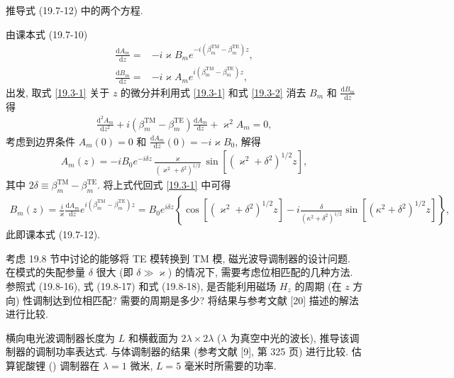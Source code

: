 \documentclass{note}
\begin{document}
\begin{exe}
    推导式 (19.7-12) 中的两个方程.
\end{exe}
\begin{pf}
    由课本式 (19.7-10)
    \begin{align}
        \label{19.3-1}
        \frac{\mathrm{d}A_m}{\mathrm{d}z}=&-i\varkappa B_me^{-i(\beta_m^{\text{TM}}-\beta_m^{\text{TE}})z},\\
        \label{19.3-2}
        \frac{\mathrm{d}B_m}{\mathrm{d}z}=&-i\varkappa A_me^{i(\beta_m^{\text{TM}}-\beta_m^{\text{TE}})z},
    \end{align}
    出发, 取式 \eqref{19.3-1} 关于 $z$ 的微分并利用式 \eqref{19.3-1} 和式 \eqref{19.3-2} 消去 $B_m$ 和 $\frac{\mathrm{d}B_m}{\mathrm{d}z}$ 得
    \begin{align}
        \frac{\mathrm{d}^2A_m}{\mathrm{d}z^2}+i(\beta_m^{\text{TM}}-\beta_m^{\text{TE}})\frac{\mathrm{d}A_m}{\mathrm{d}z}+\varkappa^2A_m=0,
    \end{align}
    考虑到边界条件 $A_m(0)=0$ 和 $\frac{\mathrm{d}A_m}{\mathrm{d}z}(0)=-i\varkappa B_0$, 解得
    \begin{align}
        A_m(z)=-iB_0e^{-i\delta z}\frac{\varkappa}{(\varkappa^2+\delta^2)^{1/2}}\sin[(\varkappa^2+\delta^2)^{1/2}z],
    \end{align}
    其中 $2\delta\equiv\beta_m^{\text{TM}}-\beta_m^{\text{TE}}$.
    将上式代回式 \eqref{19.3-1} 中可得
    \begin{align}
        B_m(z)=\frac{i}{\varkappa}\frac{\mathrm{d}A_m}{\mathrm{d}z}e^{i(\beta_m^{\text{TM}}-\beta_m^{\text{TE}})z}=B_0e^{i\delta z}\left\{\cos[(\varkappa^2+\delta^2)^{1/2}z]-i\frac{\delta}{(\kappa^2+\delta^2)^{1/2}}\sin[(\kappa^2+\delta^2)^{1/2}z]\right\},
    \end{align}
    此即课本式 (19.7-12).
\end{pf}

\begin{exe}
    考虑 19.8 节中讨论的能够将 TE 模转换到 TM 模, 磁光波导调制器的设计问题. 在模式的失配参量 $\delta$ 很大 (即 $\delta\gg\varkappa$) 的情况下, 需要考虑位相匹配的几种方法. 参照式 (19.8-16), 式 (19.8-17) 和式 (19.8-18), 是否能利用磁场 $H_z$ 的周期 (在 $z$ 方向) 性调制达到位相匹配? 需要的周期是多少? 将结果与参考文献 [20] 描述的解法进行比较.
\end{exe}
\begin{sol}
\end{sol}

\begin{exe}
    横向电光波调制器长度为 $L$ 和横截面为 $2\lambda\times 2\lambda$ ($\lambda$ 为真空中光的波长), 推导该调制器的调制功率表达式. 与体调制器的结果 (参考文献 [9], 第 325 页) 进行比较. 估算铌酸锂 () 调制器在 $\lambda=1$ 微米, $L=5$ 毫米时所需要的功率.
\end{exe}
\begin{sol}
\end{sol}
\end{document}
